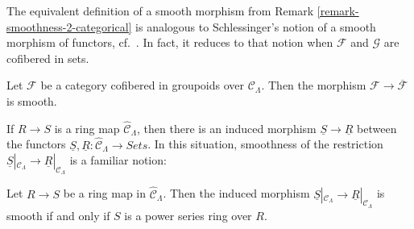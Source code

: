 \begin{remark}
\label{remark-compare-smooth-schlessinger}
The equivalent definition of a smooth morphism from Remark 
\ref{remark-smoothness-2-categorical} is analogous to Schlessinger's notion of 
a smooth morphism of functors, cf.\ \cite[Definition 2.2.]{Sch}. In 
fact, it reduces to that notion when $\mathcal{F}$ and $\mathcal{G}$ are 
cofibered in sets.
\end{remark}

\begin{remark}
\label{remark-smooth-to-iso-classes}
Let $\mathcal{F}$ be a category cofibered in groupoids over
$\mathcal{C}_\Lambda$.  Then the morphism
$\mathcal{F} \to \overline{\mathcal{F}}$ is smooth.
\end{remark}

\noindent
If $R \to S$ is a ring map $\widehat{\mathcal{C}}_\Lambda$, then there 
is an induced morphism $\underline{S} \to \underline{R}$ between the 
functors $\underline{S},\underline{R}: \widehat{\mathcal{C}}_\Lambda 
\to \textit{Sets}$.  In this situation, smoothness of the 
restriction $\underline{S}|_{\mathcal{C}_\Lambda} \to 
\underline{R}|_{\mathcal{C}_\Lambda}$ is a familiar notion:

\begin{lemma}
\label{lemma-smooth-morphism-power-series}
Let $R \to S$ be a ring map in $\widehat{\mathcal{C}}_\Lambda$.  Then 
the induced morphism $\underline{S}|_{\mathcal{C}_\Lambda} \to 
\underline{R}|_{\mathcal{C}_\Lambda}$ is smooth if and only if $S$ is a power 
series ring over $R$.
\end{lemma}

